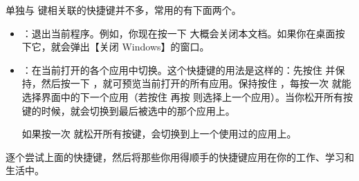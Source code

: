 单独与  键相关联的快捷键并不多，常用的有下面两个。

\begin{itemize}
  \item {}：退出当前程序。例如，你现在按一下  大概会关闭本文档。如果你在桌面按下它，就会弹出【关闭 Windows】的窗口。
  \item {}：在当前打开的各个应用中切换。这个快捷键的用法是这样的：先按住  并保持，然后按一下 ，就可预览当前打开的所有应用。保持按住 ，每按一次  就能选择界面中的下一个应用（若按住  再按  则选择上一个应用）。当你松开所有按键的时候，就会切换到最后被选中的那个应用上。

  如果按一次  就松开所有按键，会切换到上一个使用过的应用上。

\end{itemize}

\practice

逐个尝试上面的快捷键，然后将那些你用得顺手的快捷键应用在你的工作、学习和生活中。
